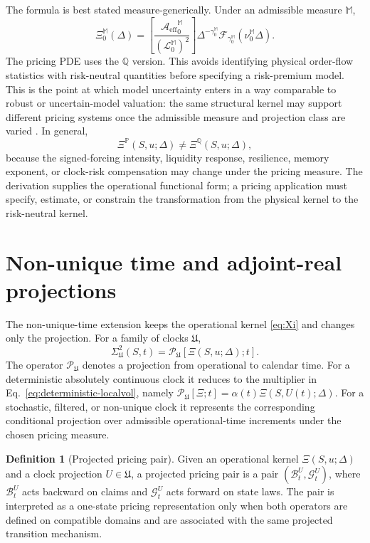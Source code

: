 \documentclass[11pt]{amsart}
\newcommand{\Q}{\mathbb{Q}}
\newcommand{\M}{\mathbb{M}}
\newcommand{\cL}{\mathcal{L}}
\newcommand{\Aeff}{\mathcal{A}_{\mathrm{eff}}}
\newcommand{\Fcal}{\mathcal{F}}
\newcommand{\Xiop}{\Xi}
\newcommand{\Bop}{\mathcal{B}}
\newcommand{\Gop}{\mathcal{G}}
\theoremstyle{definition}
\newtheorem{definition}{Definition}
\theoremstyle{plain}
\theoremstyle{remark}
\begin{document}
The formula is best stated measure-generically. Under an admissible measure $\M$,
\begin{equation}
 \Xiop_0^{\M}(\Delta)=
 \left[\frac{{\Aeff}_0^{\M}}{(\cL_0^{\M})^2}\right]
 \Delta^{-\gamma_0^{\M}}
 \Fcal_{\gamma_0^{\M}}(\nu_0^{\M}\Delta).
 \label{eq:measure-generic}
\end{equation}
The pricing PDE uses the $\Q$ version. This avoids identifying physical order-flow statistics with risk-neutral quantities before specifying a risk-premium model. This is the point at which model uncertainty enters in a way comparable to robust or uncertain-model valuation: the same structural kernel may support different pricing systems once the admissible measure and projection class are varied \cite{DenisMartini2006,Cont2006}. In general,
\begin{equation}
 \Xiop^{\mathbb P}(S,u;\Delta)\ne \Xiop^{\mathbb Q}(S,u;\Delta),
 \label{eq:P-not-Q-kernel}
\end{equation}
because the signed-forcing intensity, liquidity response, resilience, memory exponent, or clock-risk compensation may change under the pricing measure. The derivation supplies the operational functional form; a pricing application must specify, estimate, or constrain the transformation from the physical kernel to the risk-neutral kernel. 


\section{Non-unique time and adjoint-real projections}
\label{sec:adjoint-real}
The non-unique-time extension keeps the operational kernel \eqref{eq:Xi} and changes only the projection. For a family of clocks $\mathfrak U$,
\begin{equation}
 \Sigma_{\mathfrak U}^2(S,t)=\mathcal P_{\mathfrak U}[\Xiop(S,u;\Delta);t].
 \label{eq:NUT-projection}
\end{equation}
The operator $\mathcal P_{\mathfrak U}$ denotes a projection from operational to calendar time. For a deterministic absolutely continuous clock it reduces to the multiplier in Eq.~\eqref{eq:deterministic-localvol}, namely $\mathcal P_{\mathfrak U}[\Xiop;t]=\alpha(t)\Xiop(S,U(t);\Delta)$. For a stochastic, filtered, or non-unique clock it represents the corresponding conditional projection over admissible operational-time increments under the chosen pricing measure.

\begin{definition}[Projected pricing pair]
Given an operational kernel $\Xiop(S,u;\Delta)$ and a clock projection $U\in\mathfrak U$, a projected pricing pair is a pair $(\Bop_t^U,\Gop_t^U)$, where $\Bop_t^U$ acts backward on claims and $\Gop_t^U$ acts forward on state laws. The pair is interpreted as a one-state pricing representation only when both operators are defined on compatible domains and are associated with the same projected transition mechanism.
\end{definition}
\end{document}
